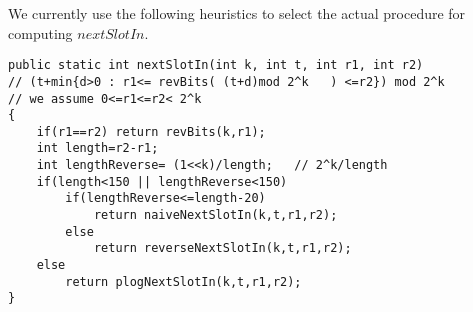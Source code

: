 We currently use the following heuristics to select the 
actual procedure for computing $nextSlotIn$.
\begin{verbatim}
public static int nextSlotIn(int k, int t, int r1, int r2)
// (t+min{d>0 : r1<= revBits( (t+d)mod 2^k   ) <=r2}) mod 2^k 
// we assume 0<=r1<=r2< 2^k 
{
    if(r1==r2) return revBits(k,r1);
    int length=r2-r1;
    int lengthReverse= (1<<k)/length;   // 2^k/length
    if(length<150 || lengthReverse<150)
        if(lengthReverse<=length-20)
            return naiveNextSlotIn(k,t,r1,r2);
        else
            return reverseNextSlotIn(k,t,r1,r2);
    else
        return plogNextSlotIn(k,t,r1,r2);
}
\end{verbatim}

